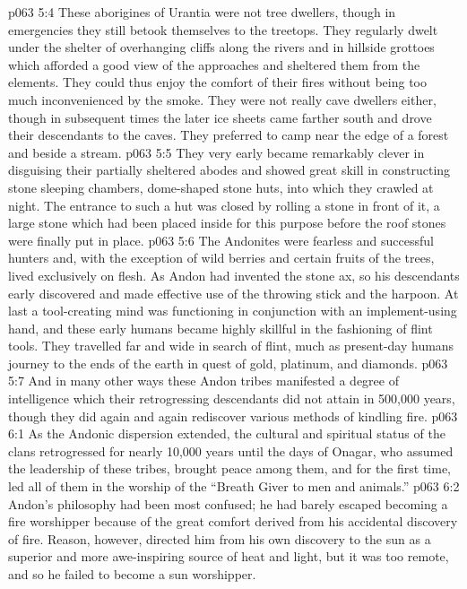 \vs p063 5:4 These aborigines of Urantia were not tree dwellers, though in emergencies they still betook themselves to the treetops. They regularly dwelt under the shelter of overhanging cliffs along the rivers and in hillside grottoes which afforded a good view of the approaches and sheltered them from the elements. They could thus enjoy the comfort of their fires without being too much inconvenienced by the smoke. They were not really cave dwellers either, though in subsequent times the later ice sheets came farther south and drove their descendants to the caves. They preferred to camp near the edge of a forest and beside a stream.
\vs p063 5:5 They very early became remarkably clever in disguising their partially sheltered abodes and showed great skill in constructing stone sleeping chambers, dome\hyp{}shaped stone huts, into which they crawled at night. The entrance to such a hut was closed by rolling a stone in front of it, a large stone which had been placed inside for this purpose before the roof stones were finally put in place.
\vs p063 5:6 The Andonites were fearless and successful hunters and, with the exception of wild berries and certain fruits of the trees, lived exclusively on flesh. As Andon had invented the stone ax, so his descendants early discovered and made effective use of the throwing stick and the harpoon. At last a tool\hyp{}creating mind was functioning in conjunction with an implement\hyp{}using hand, and these early humans became highly skillful in the fashioning of flint tools. They travelled far and wide in search of flint, much as present\hyp{}day humans journey to the ends of the earth in quest of gold, platinum, and diamonds.
\vs p063 5:7 And in many other ways these Andon tribes manifested a degree of intelligence which their retrogressing descendants did not attain in 500,000 years, though they did again and again rediscover various methods of kindling fire.
\vs p063 6:1 As the Andonic dispersion extended, the cultural and spiritual status of the clans retrogressed for nearly 10,000 years until the days of Onagar, who assumed the leadership of these tribes, brought peace among them, and for the first time, led all of them in the worship of the “Breath Giver to men and animals.”
\vs p063 6:2 \pc Andon’s philosophy had been most confused; he had barely escaped becoming a fire worshipper because of the great comfort derived from his accidental discovery of fire. Reason, however, directed him from his own discovery to the sun as a superior and more awe\hyp{}inspiring source of heat and light, but it was too remote, and so he failed to become a sun worshipper.
